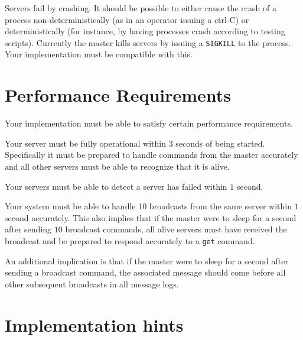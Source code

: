 \documentclass[11pt]{article}
\begin{document}
	Servers fail by crashing. It should be possible to either cause the crash of a process non-deterministically (as in an operator issuing a ctrl-C) or deterministically (for instance, by having processes crash according to testing scripts). Currently the master kills servers by issuing a \texttt{SIGKILL} to the process. Your implementation must be compatible with this.
	
	\section{Performance Requirements}
	Your implementation must be able to satisfy certain performance requirements.
	
	\begin{compactitem}
		\item Your server must be fully operational within $3$ seconds of being started. Specifically it must be prepared to handle commands from the master accurately and all other servers must be able to recognize that it is alive.
		\item Your servers must be able to detect a server has failed within $1$ second.
		\item Your system must be able to handle 10 broadcasts from the same server within $1$ second accurately. This also implies that if the master were to sleep for a second after sending $10$ broadcast commands, all alive servers must have received the broadcast and be prepared to respond accurately to a \texttt{get} command.
		\item An additional implication is that if the master were to sleep for a second after sending a broadcast command, the associated message should come before all other subsequent broadcasts in all message logs.
	\end{compactitem}
	
	\section{Implementation hints}
	
\end{document}
